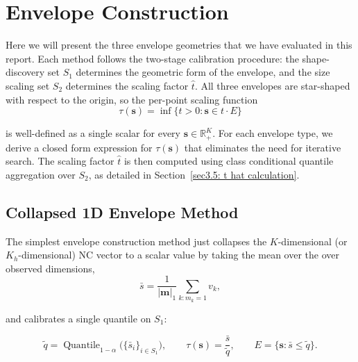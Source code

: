 \section{Envelope Construction}
\label{sec3.4: envelope construction}
Here we will present the three envelope geometries that we have evaluated in this report. Each method follows the 
two-stage calibration procedure: the shape-discovery set $S_1$ determines the geometric form of the envelope, and the 
size scaling set $S_2$ determines the scaling factor $\hat{t}$. All three envelopes are star-shaped with respect to the origin, 
so the per-point scaling function
\begin{equation}
\label{eq: tau-def}
\tau(\mathbf{s}) = \inf\{t > 0 : \mathbf{s} \in t \cdot E\}
\end{equation}

is well-defined as a single scalar for every $\mathbf{s} \in \mathbb{R}^K_+$. For each envelope type, we derive a 
closed form expression for $\tau(\mathbf{s})$ that eliminates the need for iterative search. The scaling factor $\hat{t}$ is 
then computed using class conditional quantile aggregation over $S_2$, as detailed in Section~\ref{sec3.5: t hat calculation}.


\subsection{Collapsed 1D Envelope Method}
\label{sec3.4.1: collapsed 1d}
The simplest envelope construction method just collapses the $K$-dimensional (or $K_h$-dimensional) NC vector to a 
scalar value by taking the mean over the over observed dimensions,
\begin{equation*}
\bar{s} = \frac{1}{|\mathbf{m}|_1} \sum_{k : m_k = 1} v_k,
\end{equation*}

and calibrates a single quantile on $S_1$:

\begin{equation*}
\tilde{q} = \operatorname{Quantile}_{1-\alpha}\big(\{\bar{s}_i\}_{i \in S_1}\big), \qquad 
\tau(\mathbf{s}) = \frac{\bar{s}}{\tilde{q}}, \qquad E = \{\mathbf{s} : \bar{s} \le \tilde{q}\}.
\end{equation*}

